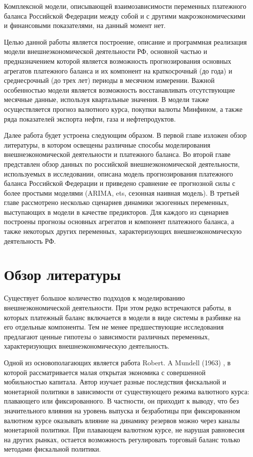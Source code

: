 \documentclass[a4paper, 14pt]{extarticle}
\begin{document}
Комплексной модели, описывающей взаимозависимости переменных платежного баланса Российской Федерации между собой и с другими макроэкономическими и финансовыми показателями, на данный момент нет.  

Целью данной работы является построение, описание и программная реализация модели внешнеэкономической деятельности РФ, основной частью и предназначением которой является возможность прогнозирования основных агрегатов платежного баланса и их компонент на краткосрочный (до года) и среднесрочный (до трех лет) периоды в месячном измерении. 
Важной особенностью модели является возможность восстанавливать отсутствующие месячные данные, используя квартальные значения. 
В модели также осуществляется прогноз валютного курса, покупки валюты Минфином, а также ряда показателей экспорта нефти, газа и нефтепродуктов.

Далее работа будет устроена следующим образом. 
В первой главе изложен обзор литературы, в котором освещены различные способы моделирования внешнеэкономической деятельности и платежного баланса. 
Во второй главе представлен обзор данных по российской внешнеэкономической деятельности, используемых в исследовании, описана модель прогнозирования платежного баланса Российской Федерации и приведено сравнение ее прогнозной силы с более простыми моделями (ARIMA, ets, сезонная наивная модель).
В третьей главе рассмотрено несколько сценариев динамики экзогенных переменных, выступающих в модели в качестве предикторов. 
Для каждого из сценариев построены прогнозы основных агрегатов и компонент платежного баланса, а также некоторых других переменных, характеризующих внешнеэкономическую деятельность РФ.
\newpage
\section{Обзор литературы}
Существует большое количество подходов к моделированию внешнеэкономической деятельности. 
При этом редко встречаются работы, в которых платежный баланс включается в модели в виде системы в разбивке на его отдельные компоненты.
Тем не менее предшествующие исследования предлагают ценные гипотезы о зависимости различных переменных, характеризующих внешнеэкономическую деятельность. 

Одной из основополагающих является работа Robert. A Mundell (1963) \autocite{mundell1963capital}, в которой рассматривается малая открытая экономика с совершенной мобильностью капитала.
Автор изучает разные последствия фискальной и монетарной политики в зависимости от существующего режима валютного курса: плавающего или фиксированного.
В частности, он приходит к выводу, что без значительного влияния на уровень выпуска и безработицы при фиксированном валютном курсе оказывать влияние на динамику резервов можно через каналы монетарной политики. 
При плавающем валютном курсе, не нарушая равновесия на других рынках, остается возможность регулировать торговый баланс только методами фискальной политики.
\end{document}
